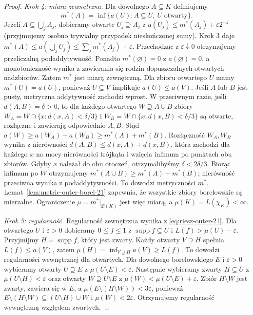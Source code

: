 \begin{proof}
\emph{Krok 4: miara zewnętrzna.}
Dla dowolnego $A\subseteq K$ definiujemy
\begin{equation}\label{eq:riesz-outer-21}
 m^*(A)=\inf\{a(U):A\subseteq U,\ U\text{ otwarty}\}.
\end{equation}
Jeżeli $A\subseteq\bigcup_j A_j$, dobieramy otwarte
$U_j\supseteq A_j$ z
$a(U_j)\le m^*(A_j)+\varepsilon2^{-j}$ (przyjmujemy
osobno trywialny przypadek nieskończonej sumy).
Krok 3 daje
$m^*(A)\le a(\bigcup_jU_j)\le\sum_jm^*(A_j)+\varepsilon$.
Przechodząc z $\varepsilon\downarrow0$ otrzymujemy
przeliczalną podaddytywność. Ponadto
$m^*(\varnothing)=0$ z $a(\varnothing)=0$,
a monotoniczność wynika z zawierania się rodzin
dopuszczalnych otwartych nadzbiorów. Zatem $m^*$
jest miarą zewnętrzną.
Dla zbioru otwartego $U$ mamy $m^*(U)=a(U)$, ponieważ
$U\subseteq V$ implikuje $a(U)\le a(V)$.
Jeśli $A$ lub $B$ jest pusty, metryczna addytywność zachodzi wprost. W przeciwnym razie, jeśli $d(A,B)=\delta>0$, to dla każdego otwartego
$W\supseteq A\cup B$ zbiory
$W_A=W\cap\{x:d(x,A)<\delta/3\}$ i
$W_B=W\cap\{x:d(x,B)<\delta/3\}$ są otwarte,
rozłączne i zawierają odpowiednio $A,B$. Stąd
$a(W)\ge a(W_A)+a(W_B)\ge m^*(A)+m^*(B)$.
Rozłączność $W_A,W_B$ wynika z nierówności
$d(A,B)\le d(x,A)+d(x,B)$, która zachodzi dla
każdego $x$ na mocy nierówności trójkąta i wzięcia
infimum po punktach obu zbiorów. Gdyby $x$ należał
do obu otoczeń, otrzymalibyśmy $\delta<2\delta/3$.
Biorąc infimum po $W$ otrzymujemy
$m^*(A\cup B)\ge m^*(A)+m^*(B)$; nierówność
przeciwna wynika z podaddytywności. To dowodzi
metryczności $m^*$.
Lemat~\ref{lem:metric-outer-borel-21} zapewnia, że
wszystkie zbiory borelowskie są mierzalne. Ograniczenie
$\mu=m^*|_{\mathcal B(K)}$ jest więc miarą, a
$\mu(K)=L(\chi_K)<\infty$.

\emph{Krok 5: regularność.}
Regularność zewnętrzna wynika z \eqref{eq:riesz-outer-21}.
Dla otwartego $U$ i $\varepsilon>0$ dobieramy
$0\le f\le1$ z $\operatorname{supp}f\subseteq U$ i
$L(f)>\mu(U)-\varepsilon$. Przyjmijmy
$H=\operatorname{supp}f$, który jest zwarty.
Każdy otwarty $V\supseteq H$ spełnia
$L(f)\le a(V)$, zatem
$\mu(H)=\inf_{V\supseteq H}a(V)\ge L(f)$.
To dowodzi regularności wewnętrznej dla otwartych.
Dla dowolnego borelowskiego $E$ i $\varepsilon>0$
wybieramy otwarty $U\supseteq E$ z
$\mu(U\setminus E)<\varepsilon$.
Następnie wybieramy zwarty $H\subseteq U$ z
$\mu(U\setminus H)<\varepsilon$ oraz otwarty
$W\supseteq U\setminus E$ z
$\mu(W)<\mu(U\setminus E)+\varepsilon$.
Zbiór $H\setminus W$ jest zwarty, zawiera się w $E$,
a $\mu(E\setminus(H\setminus W))<3\varepsilon$,
ponieważ $E\setminus(H\setminus W)\subseteq(U\setminus H)\cup W$
i $\mu(W)<2\varepsilon$.
Otrzymujemy regularność wewnętrzną względem zwartych.


\end{proof}

